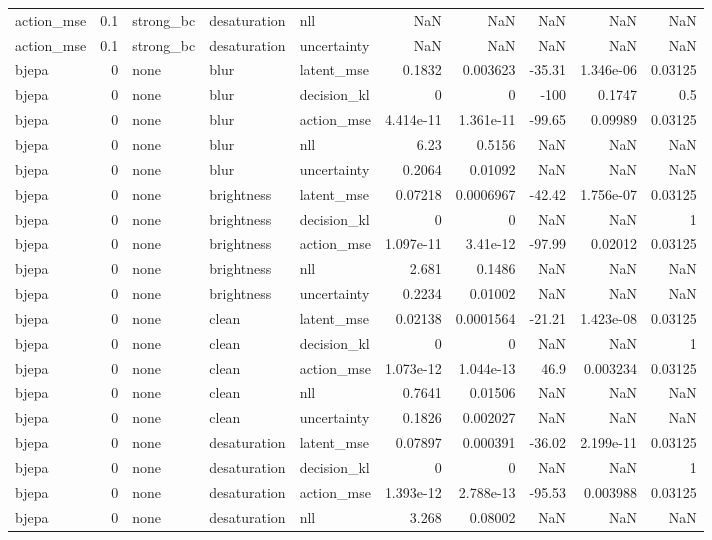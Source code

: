 \begin{tabular}{lrlllrrrrr}
action\_mse & 0.1 & strong\_bc & desaturation & nll & NaN & NaN & NaN & NaN & NaN \\
action\_mse & 0.1 & strong\_bc & desaturation & uncertainty & NaN & NaN & NaN & NaN & NaN \\
bjepa & 0 & none & blur & latent\_mse & 0.1832 & 0.003623 & -35.31 & 1.346e-06 & 0.03125 \\
bjepa & 0 & none & blur & decision\_kl & 0 & 0 & -100 & 0.1747 & 0.5 \\
bjepa & 0 & none & blur & action\_mse & 4.414e-11 & 1.361e-11 & -99.65 & 0.09989 & 0.03125 \\
bjepa & 0 & none & blur & nll & 6.23 & 0.5156 & NaN & NaN & NaN \\
bjepa & 0 & none & blur & uncertainty & 0.2064 & 0.01092 & NaN & NaN & NaN \\
bjepa & 0 & none & brightness & latent\_mse & 0.07218 & 0.0006967 & -42.42 & 1.756e-07 & 0.03125 \\
bjepa & 0 & none & brightness & decision\_kl & 0 & 0 & NaN & NaN & 1 \\
bjepa & 0 & none & brightness & action\_mse & 1.097e-11 & 3.41e-12 & -97.99 & 0.02012 & 0.03125 \\
bjepa & 0 & none & brightness & nll & 2.681 & 0.1486 & NaN & NaN & NaN \\
bjepa & 0 & none & brightness & uncertainty & 0.2234 & 0.01002 & NaN & NaN & NaN \\
bjepa & 0 & none & clean & latent\_mse & 0.02138 & 0.0001564 & -21.21 & 1.423e-08 & 0.03125 \\
bjepa & 0 & none & clean & decision\_kl & 0 & 0 & NaN & NaN & 1 \\
bjepa & 0 & none & clean & action\_mse & 1.073e-12 & 1.044e-13 & 46.9 & 0.003234 & 0.03125 \\
bjepa & 0 & none & clean & nll & 0.7641 & 0.01506 & NaN & NaN & NaN \\
bjepa & 0 & none & clean & uncertainty & 0.1826 & 0.002027 & NaN & NaN & NaN \\
bjepa & 0 & none & desaturation & latent\_mse & 0.07897 & 0.000391 & -36.02 & 2.199e-11 & 0.03125 \\
bjepa & 0 & none & desaturation & decision\_kl & 0 & 0 & NaN & NaN & 1 \\
bjepa & 0 & none & desaturation & action\_mse & 1.393e-12 & 2.788e-13 & -95.53 & 0.003988 & 0.03125 \\
bjepa & 0 & none & desaturation & nll & 3.268 & 0.08002 & NaN & NaN & NaN \\

\end{tabular}
